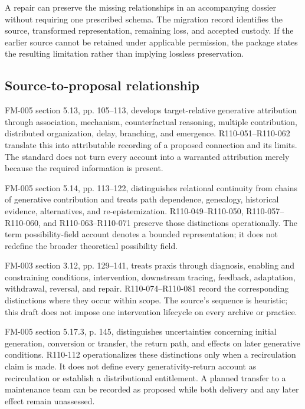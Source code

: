 \documentclass[11pt,a4paper]{article}
\begin{document}
A repair can preserve the missing relationships in an accompanying dossier without requiring one prescribed schema. The migration record identifies the source, transformed representation, remaining loss, and accepted custody. If the earlier source cannot be retained under applicable permission, the package states the resulting limitation rather than implying lossless preservation.

\subsection{Source-to-proposal relationship}
FM-005 section 5.13, pp. 105--113, develops target-relative generative attribution through association, mechanism, counterfactual reasoning, multiple contribution, distributed organization, delay, branching, and emergence. R110-051--R110-062 translate this into attributable recording of a proposed connection and its limits. The standard does not turn every account into a warranted attribution merely because the required information is present.

FM-005 section 5.14, pp. 113--122, distinguishes relational continuity from chains of generative contribution and treats path dependence, genealogy, historical evidence, alternatives, and re-epistemization. R110-049--R110-050, R110-057--R110-060, and R110-063--R110-071 preserve those distinctions operationally. The term possibility-field account denotes a bounded representation; it does not redefine the broader theoretical possibility field.

FM-003 section 3.12, pp. 129--141, treats praxis through diagnosis, enabling and constraining conditions, intervention, downstream tracing, feedback, adaptation, withdrawal, reversal, and repair. R110-074--R110-081 record the corresponding distinctions where they occur within scope. The source's sequence is heuristic; this draft does not impose one intervention lifecycle on every archive or practice.

FM-005 section 5.17.3, p. 145, distinguishes uncertainties concerning initial generation, conversion or transfer, the return path, and effects on later generative conditions. R110-112 operationalizes these distinctions only when a recirculation claim is made. It does not define every generativity-return account as recirculation or establish a distributional entitlement. A planned transfer to a maintenance team can be recorded as proposed while both delivery and any later effect remain unassessed.
\end{document}
